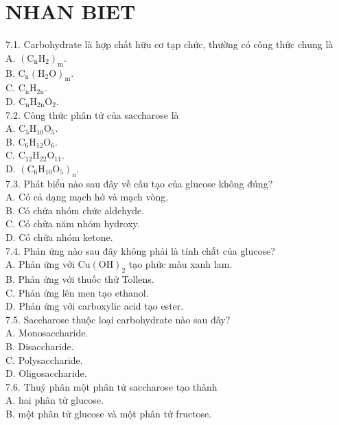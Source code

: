\documentclass[10pt]{article}
\begin{document}
\section*{NHAN BIET}
7.1. Carbohydrate là hợp chất hữu cơ tạp chức, thường có công thức chung là\\
A. $\left(\mathrm{C}_{\mathrm{n}} \mathrm{H}_{2}\right)_{\mathrm{m}}$.\\
B. $\mathrm{C}_{\mathrm{n}}\left(\mathrm{H}_{2} \mathrm{O}\right)_{\mathrm{m}}$.\\
C. $\mathrm{C}_{\mathrm{n}} \mathrm{H}_{2 \mathrm{n}}$.\\
D. $\mathrm{C}_{\mathrm{n}} \mathrm{H}_{2 \mathrm{n}} \mathrm{O}_{2}$.\\
7.2. Công thức phân tử của saccharose là\\
A. $\mathrm{C}_{5} \mathrm{H}_{10} \mathrm{O}_{5}$.\\
B. $\mathrm{C}_{6} \mathrm{H}_{12} \mathrm{O}_{6}$.\\
C. $\mathrm{C}_{12} \mathrm{H}_{22} \mathrm{O}_{11}$.\\
D. $\left(\mathrm{C}_{6} \mathrm{H}_{10} \mathrm{O}_{5}\right)_{\mathrm{n}}$.\\
7.3. Phát biểu nào sau đây về cấu tạo của glucose không đúng?\\
A. Có cả dạng mạch hở và mạch vòng.\\
B. Có chứa nhóm chức aldehyde.\\
C. Có chứa năm nhóm hydroxy.\\
D. Có chứa nhóm ketone.\\
7.4. Phản ứng nào sau đây không phải là tính chất của glucose?\\
A. Phản ứng với $\mathrm{Cu}(\mathrm{OH})_{2}$ tạo phức màu xanh lam.\\
B. Phản ứng với thuốc thử Tollens.\\
C. Phản ứng lên men tạo ethanol.\\
D. Phản ứng với carboxylic acid tạo ester.\\
7.5. Saccharose thuộc loại carbohydrate nào sau đây?\\
A. Monosaccharide.\\
B. Disaccharide.\\
C. Polysaccharide.\\
D. Oligosaccharide.\\
7.6. Thuỷ phân một phân tử saccharose tạo thành\\
A. hai phân tử glucose.\\
B. một phân tử glucose và một phân tử fructose.\\
\end{document}
